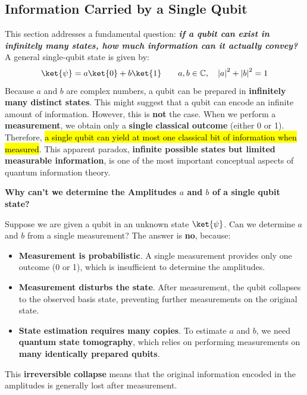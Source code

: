 \subsection{Information Carried by a Single Qubit}

This section addresses a fundamental question: \textbf{\emph{if a qubit can exist in infinitely many states, how much information can it actually convey?}} A general single-qubit state is given by:
\begin{equation*}
    \ket{\psi} = a\ket{0} + b\ket{1} \qquad a,b \in \mathbb{C}, \quad \left|a\right|^2 + \left|b\right|^2 = 1
\end{equation*}
Because $a$ and $b$ are complex numbers, a qubit can be prepared in \textbf{infinitely many distinct states}. This might suggest that a qubit can encode an infinite amount of information. However, this is \textbf{not} the case. When we perform a \textbf{measurement}, we obtain only a \textbf{single classical outcome} (either 0 or 1). Therefore, \hl{a single qubit can yield at most one classical bit of information when measured}. This apparent paradox, \textbf{infinite possible states but limited measurable information}, is one of the most important conceptual aspects of quantum information theory.

\highspace
\begin{flushleft}
    \textcolor{Green3}{ \textbf{Why can't we determine the Amplitudes $a$ and $b$ of a single qubit state?}}
\end{flushleft}
Suppose we are given a qubit in an unknown state $\ket{\psi}$. Can we determine $a$ and $b$ from a single measurement? The answer is \textbf{no}, because:
\begin{itemize}
    \item[\textcolor{Red2}{\faIcon{times}}] \textbf{Measurement is probabilistic}. A single measurement provides only one outcome (0 or 1), which is insufficient to determine the amplitudes.
    \item[\textcolor{Red2}{\faIcon{times}}] \textbf{Measurement disturbs the state}. After measurement, the qubit collapses to the observed basis state, preventing further measurements on the original state.
    \item[\textcolor{Red2}{\faIcon{times}}] \textbf{State estimation requires many copies}. To estimate $a$ and $b$, we need \textbf{quantum state tomography}, which relies on performing measurements on \textbf{many identically prepared qubits}.
\end{itemize}
This \textbf{irreversible collapse} means that the original information encoded in the amplitudes is generally lost after measurement.

